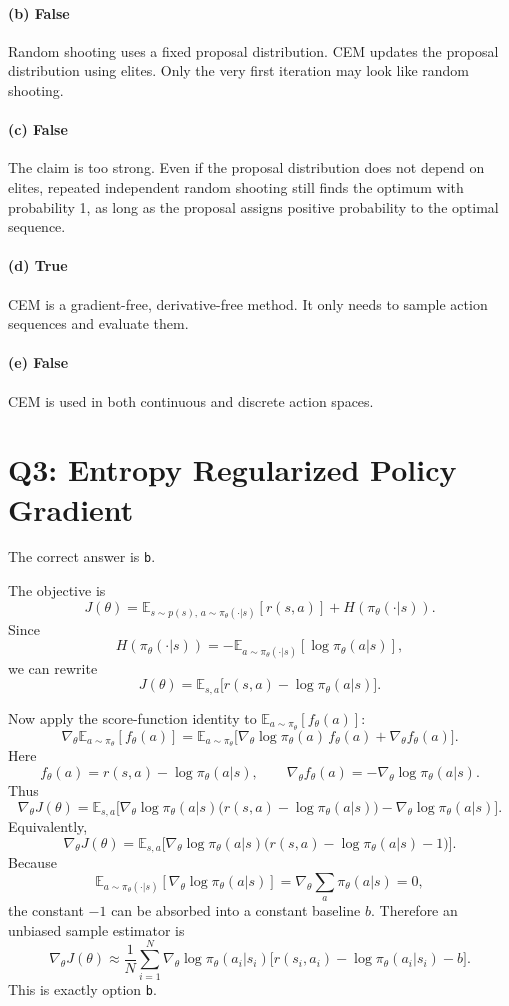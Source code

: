 \documentclass[11pt]{article}
\newcommand{\E}{\mathbb{E}}
\newcommand{\1}{\mathbf{1}}
\begin{document}
\paragraph{(b) False}
Random shooting uses a fixed proposal distribution. CEM updates the proposal distribution using elites. Only the very first iteration may look like random shooting.

\paragraph{(c) False}
The claim is too strong. Even if the proposal distribution does not depend on elites, repeated independent random shooting still finds the optimum with probability 1, as long as the proposal assigns positive probability to the optimal sequence.

\paragraph{(d) True}
CEM is a gradient-free, derivative-free method. It only needs to sample action sequences and evaluate them.

\paragraph{(e) False}
CEM is used in both continuous and discrete action spaces.

\section{Q3: Entropy Regularized Policy Gradient}
The correct answer is \texttt{b}.

The objective is
\[
J(\theta)=
\E_{s\sim p(s),\,a\sim \pi_\theta(\cdot|s)}[r(s,a)]
+ H(\pi_\theta(\cdot|s)).
\]
Since
\[
H(\pi_\theta(\cdot|s))
= -\E_{a\sim \pi_\theta(\cdot|s)}[\log \pi_\theta(a|s)],
\]
we can rewrite
\[
J(\theta)
= \E_{s,a}\big[r(s,a)-\log \pi_\theta(a|s)\big].
\]

Now apply the score-function identity to $\E_{a\sim \pi_\theta}[f_\theta(a)]$:
\[
\nabla_\theta \E_{a\sim \pi_\theta}[f_\theta(a)]
=
\E_{a\sim \pi_\theta}
\big[
\nabla_\theta \log \pi_\theta(a)\,f_\theta(a)
+\nabla_\theta f_\theta(a)
\big].
\]
Here
\[
f_\theta(a)=r(s,a)-\log \pi_\theta(a|s),
\qquad
\nabla_\theta f_\theta(a)=-\nabla_\theta \log \pi_\theta(a|s).
\]
Thus
\[
\nabla_\theta J(\theta)
=
\E_{s,a}
\Big[
\nabla_\theta \log \pi_\theta(a|s)\big(r(s,a)-\log \pi_\theta(a|s)\big)
-\nabla_\theta \log \pi_\theta(a|s)
\Big].
\]
Equivalently,
\[
\nabla_\theta J(\theta)
=
\E_{s,a}
\Big[
\nabla_\theta \log \pi_\theta(a|s)\big(r(s,a)-\log \pi_\theta(a|s)-1\big)
\Big].
\]
Because
\[
\E_{a\sim \pi_\theta(\cdot|s)}[\nabla_\theta \log \pi_\theta(a|s)]
= \nabla_\theta \sum_a \pi_\theta(a|s)=0,
\]
the constant $-1$ can be absorbed into a constant baseline $b$. Therefore an unbiased sample estimator is
\[
\nabla_\theta J(\theta)
\approx
\frac{1}{N}\sum_{i=1}^N
\nabla_\theta \log \pi_\theta(a_i|s_i)
\Big[r(s_i,a_i)-\log \pi_\theta(a_i|s_i)-b\Big].
\]
This is exactly option \texttt{b}.
\end{document}
